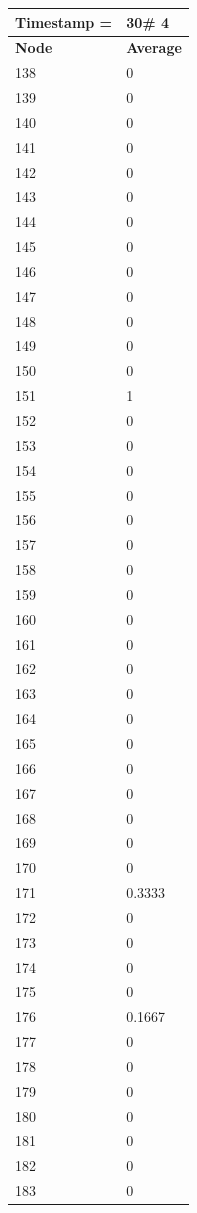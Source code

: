 \begin{tabular}{|l||l|}
\hline
\textbf{Timestamp =} & \textbf{30}\# 4\\\hline
	\textbf{Node} & \textbf{Average} \\ \hline
\hline
	138 & 0 \\ \hline
	139 & 0 \\ \hline
	140 & 0 \\ \hline
	141 & 0 \\ \hline
	142 & 0 \\ \hline
	143 & 0 \\ \hline
	144 & 0 \\ \hline
	145 & 0 \\ \hline
	146 & 0 \\ \hline
	147 & 0 \\ \hline
	148 & 0 \\ \hline
	149 & 0 \\ \hline
	150 & 0 \\ \hline
	151 & 1 \\ \hline
	152 & 0 \\ \hline
	153 & 0 \\ \hline
	154 & 0 \\ \hline
	155 & 0 \\ \hline
	156 & 0 \\ \hline
	157 & 0 \\ \hline
	158 & 0 \\ \hline
	159 & 0 \\ \hline
	160 & 0 \\ \hline
	161 & 0 \\ \hline
	162 & 0 \\ \hline
	163 & 0 \\ \hline
	164 & 0 \\ \hline
	165 & 0 \\ \hline
	166 & 0 \\ \hline
	167 & 0 \\ \hline
	168 & 0 \\ \hline
	169 & 0 \\ \hline
	170 & 0 \\ \hline
	171 & 0.3333 \\ \hline
	172 & 0 \\ \hline
	173 & 0 \\ \hline
	174 & 0 \\ \hline
	175 & 0 \\ \hline
	176 & 0.1667 \\ \hline
	177 & 0 \\ \hline
	178 & 0 \\ \hline
	179 & 0 \\ \hline
	180 & 0 \\ \hline
	181 & 0 \\ \hline
	182 & 0 \\ \hline
	183 & 0 \\ \hline
\end{tabular}
